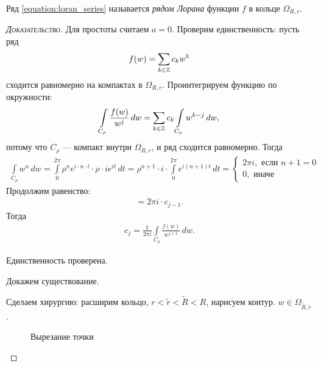\documentclass[../complex-analysis.tex]{subfiles}
\begin{document}
\begin{df}
 Ряд \eqref{equation:loran_series} называется \textit{рядом Лорана} функции $ f $ в кольце $ \Omega_{R,r} $.
\end{df}
\begin{proof}[\normalfont\textsc{Доказательство}]
 Для простоты считаем $ a = 0 $. Проверим единственность: пусть ряд
 \begin{align*}
  f(w) = \sum_{k \in \mathbb{Z}}c_k w^{k}
 \end{align*} сходится равномерно на компактах в $ \Omega_{R,r} $. Проинтегрируем функцию по окружности:
 \begin{align*}
  \int\limits_{C_\rho} \frac{f(w)}{w^{j}} \,dw = \sum_{k \in \mathbb{Z}} c_k \int\limits_{C_\rho} w^{k-j}\,dw,
 \end{align*} потому что $ C_\rho $ --- компакт внутри $ \Omega_{R,r} $, и ряд сходится равномерно. Тогда
 \begin{align*}
  \int\limits_{C_\rho} w^{n}  \, dw = \int\limits_{0}^{2\pi}  \rho^{n} e^{i \cdot n \cdot t} \cdot \rho \cdot i e^{it}\,dt = \rho^{n+1} \cdot i \cdot \int\limits_{0}^{2\pi} e^{i(n+1)t}\,dt = \begin{cases}
   2\pi i, \text{ если } n+1=0 \\
   0, \text{ иначе }
  \end{cases} 
 \end{align*} Продолжим равенство:
 \begin{align*}
  = 2\pi i \cdot c_{j-1}.
 \end{align*} Тогда
 \begin{align*}
  c_j = \frac{1}{2\pi i} \int\limits_{C_\rho}   \frac{f(w)}{w^{j+1}}\,dw.
 \end{align*}

 Единственность проверена.

 Докажем существование.

 Сделаем хирургию: расширим кольцо, $ r < \tilde r < \tilde R < R $, нарисуем контур. $ w \in \Omega_{\tilde R, \tilde r} $.

\begin{figure}[ht]
    \centering
    \caption{Вырезание точки}
    \label{fig:laurent-series-point-surgery}
\end{figure}


\end{proof}
\end{document}
